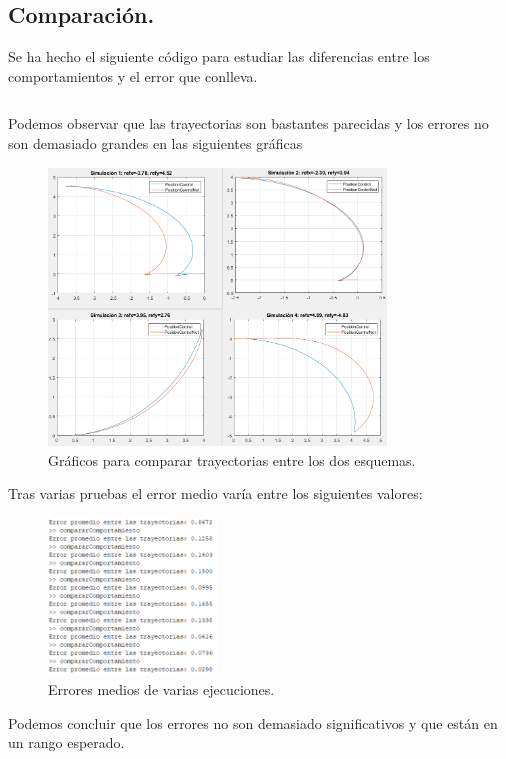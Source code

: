 \documentclass[a4paper, 12pt]{article}
\begin{document}
	\subsection{Comparación.}
	Se ha hecho el siguiente código para estudiar las diferencias entre los comportamientos y el error que conlleva.
	\inputminted[fontsize=\scriptsize, linenos, breaklines=true, xleftmargin=0.75cm, frame=lines]{matlab}{code/parte2/compararComportamiento.m}
	\newpage
	Podemos observar que las trayectorias son bastantes parecidas y los  errores no son demasiado grandes en las siguientes gráficas
	\begin{figure}[htp!]
		\centering
		\includegraphics[width=0.8\textwidth]{figures/parte2/ejerI.png}
		\caption{Gráficos para comparar trayectorias entre los dos esquemas.}
	\end{figure}
	
	Tras varias pruebas el error medio varía entre los siguientes valores:
	\begin{figure}[htp!]
		\centering
		\includegraphics[width=0.4\textwidth]{figures/parte2/ejerI2.png}
		\caption{Errores medios de varias ejecuciones.}
	\end{figure}
	
	Podemos concluir que los errores no son demasiado significativos y que están en un rango esperado.
	
 
\end{document}
